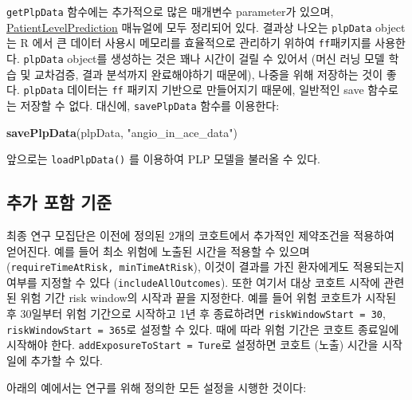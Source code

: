 \documentclass[10.5pt]{book}
\newenvironment{Shaded}{\begin{snugshade}}{\end{snugshade}}
\newcommand{\KeywordTok}[1]{\textcolor[rgb]{0.13,0.29,0.53}{\textbf{#1}}}
\newcommand{\StringTok}[1]{\textcolor[rgb]{0.31,0.60,0.02}{#1}}
\newcommand{\NormalTok}[1]{#1}
\theoremstyle{definition}
\theoremstyle{definition}
\theoremstyle{definition}
\theoremstyle{remark}
\begin{document}
\texttt{getPlpData} 함수에는 추가적으로 많은 매개변수 parameter가
있으며,
\href{https://ohdsi.github.io/PatientLevelPrediction/}{PatientLevelPrediction}
매뉴얼에 모두 정리되어 있다. 결과상 나오는 \texttt{plpData} object는 R
에서 큰 데이터 사용시 메모리를 효율적으로 관리하기 위하여
\texttt{ff}패키지를 사용한다. \texttt{plpData} object를 생성하는 것은
꽤나 시간이 걸릴 수 있어서 (머신 러닝 모델 학습 및 교차검증, 결과
분석까지 완료해야하기 때문에), 나중을 위해 저장하는 것이 좋다.
\texttt{plpData} 데이터는 \texttt{ff} 패키지 기반으로 만들어지기 때문에,
일반적인 save 함수로는 저장할 수 없다. 대신에, \texttt{savePlpData}
함수를 이용한다:

\begin{Shaded}
\begin{Highlighting}[]
\KeywordTok{savePlpData}\NormalTok{(plpData, }\StringTok{"angio_in_ace_data"}\NormalTok{)}
\end{Highlighting}
\end{Shaded}

앞으로는 \texttt{loadPlpData()} 를 이용하여 PLP 모델을 불러올 수 있다.

\subsection{추가 포함 기준}\label{--}

최종 연구 모집단은 이전에 정의된 2개의 코호트에서 추가적인 제약조건을
적용하여 얻어진다. 예를 들어 최소 위험에 노출된 시간을 적용할 수 있으며
(\texttt{requireTimeAtRisk,\ minTimeAtRisk}), 이것이 결과를 가진
환자에게도 적용되는지 여부를 지정할 수 있다
(\texttt{includeAllOutcomes}). 또한 여기서 대상 코호트 시작에 관련된
위험 기간 risk window의 시작과 끝을 지정한다. 예를 들어 위험 코호트가
시작된 후 30일부터 위험 기간으로 시작하고 1년 후 종료하려면
\texttt{riskWindowStart\ =\ 30}, \texttt{riskWindowStart\ =\ 365}로
설정할 수 있다. 때에 따라 위험 기간은 코호트 종료일에 시작해야 한다.
\texttt{addExposureToStart\ =\ Ture}로 설정하면 코호트 (노출) 시간을
시작일에 추가할 수 있다.

아래의 예에서는 연구를 위해 정의한 모든 설정을 시행한 것이다:
\end{document}

